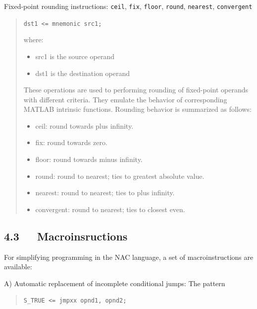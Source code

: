 \documentclass[a4paper]{article}
\newenvironment{DUlineblock}[1]{%
    \list{}{\setlength{\partopsep}{\parskip}
            \addtolength{\partopsep}{\baselineskip}
            \setlength{\topsep}{0pt}
            \setlength{\itemsep}{0.15\baselineskip}
            \setlength{\parsep}{0pt}
            \setlength{\leftmargin}{#1}}
    \raggedright
  }
  {\endlist}
\begin{document}
Fixed-point rounding instructions: \texttt{ceil}, \texttt{fix}, \texttt{floor}, \texttt{round}, \texttt{nearest}, \texttt{convergent}
%
\begin{quote}

\texttt{dst1 <= mnemonic src1;}

where:
%
\begin{itemize}

\item src1 is the source operand

\item dst1 is the destination operand

\end{itemize}

These operations are used to performing rounding of fixed-point operands with
different criteria. They emulate the behavior of corresponding MATLAB intrinsic
functions. Rounding behavior is summarized as follows:
%
\begin{itemize}

\item ceil: round towards plus infinity.

\item fix: round towards zero.

\item floor: round towards minus infinity.

\item round: round to nearest; ties to greatest absolute value.

\item nearest: round to nearest; ties to plus infinity.

\item convergent: round to nearest; ties to closest even.

\end{itemize}

\end{quote}


\subsection{4.3~~~Macroinsructions%
  \label{macroinsructions}%
}

For simplifying programming in the NAC language, a set of macroinstructions
are available:

A) Automatic replacement of incomplete conditional jumps:
The pattern
%
\begin{quote}

\begin{DUlineblock}{0em}
\item[] \texttt{S\_TRUE <= jmpxx opnd1, opnd2;}
\end{DUlineblock}

\end{quote}
\end{document}
